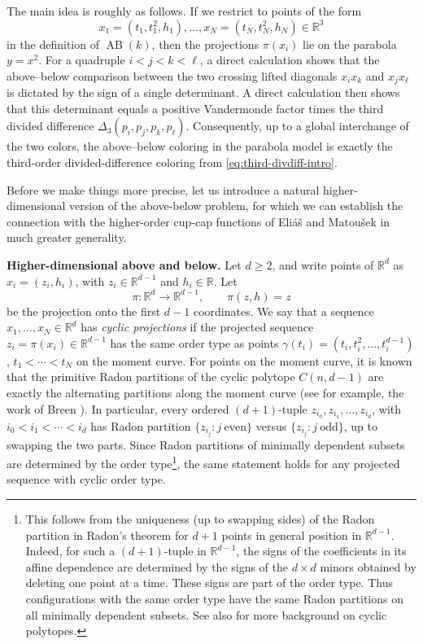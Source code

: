 \documentclass[11pt]{article}
\newcommand{\AB}{\operatorname{AB}}
\begin{document}
The main idea is roughly as follows. If we restrict to points of the form
\[
x_1=(t_1,t_1^2,h_1),\ldots,x_N=(t_N,t_N^2,h_N)\in\mathbb R^3
\]
in the definition of $\AB(k)$, then the projections $\pi(x_i)$ lie on the parabola $y=x^2$. For a quadruple $i<j<k<\ell$, a direct calculation shows that the above--below comparison between the two crossing lifted diagonals $x_i x_k$ and $x_jx_\ell$ is dictated by the sign of a single determinant. A direct calculation then shows that this determinant equals a positive Vandermonde factor times the third divided difference $\Delta_3(p_i,p_j,p_k,p_\ell)$. Consequently, up to a global interchange of the two colors, the above--below coloring in the parabola model is exactly the third-order divided-difference coloring from \eqref{eq:third-divdiff-intro}. 

Before we make things more precise, let us introduce a natural higher-dimensional version of the above-below problem, for which we can establish the connection with the higher-order cup-cap functions of Eli\'a\v{s} and Matou\v{s}ek in much greater generality. 

\bigskip

\noindent\textbf{Higher-dimensional above and below.} Let $d\ge 2$, and write points of $\mathbb R^d$ as $x_i=(z_i,h_i)$, with $z_i\in\mathbb R^{d-1}$ and $h_i\in\mathbb R$. Let
\[
\pi:\mathbb R^d\to\mathbb R^{d-1},
\qquad
\pi(z,h)=z
\]
be the projection onto the first $d-1$ coordinates. We say that a sequence $x_1,\dots,x_N\in\mathbb R^d$ has
\emph{cyclic projections} if the projected sequence
$z_i=\pi(x_i)\in\mathbb R^{d-1}$ has the same order type as points $\gamma(t_i)=(t_i,t_i^2,\dots,t_i^{d-1})$, $t_1<\cdots<t_N$ on the moment curve. For points on the moment curve, it is known that the primitive Radon partitions of the cyclic polytope $C(n,d-1)$ are exactly the alternating partitions along the moment curve (see for example, the work of Breen \cite{Breen73}). In particular, every ordered $(d+1)$-tuple $z_{i_0},z_{i_1},\dots,z_{i_d}$, with $i_0<i_1<\cdots<i_d$ has Radon partition $\{z_{i_j}:j\ \mathrm{even}\}$ versus $\{z_{i_j}:j\ \mathrm{odd}\}$, up to swapping the two parts. Since Radon partitions of minimally dependent subsets are determined by the order type\footnote{This follows from the uniqueness (up to swapping sides) of the Radon partition in Radon's theorem \cite{Radon} for $d+1$ points in general position in $\mathbb{R}^{d-1}$. Indeed, for such a $(d+1)$-tuple in $\mathbb R^{d-1}$, the signs of the coefficients in its affine dependence are determined by the signs of the $d\times d$ minors obtained by deleting one point at a time. These signs are part of the order type. Thus configurations with the same order type have the same Radon partitions on all minimally dependent subsets. See also \cite{Ziegler} for more background on cyclic polytopes.}, the same statement holds for any projected sequence with cyclic order type.
\end{document}
